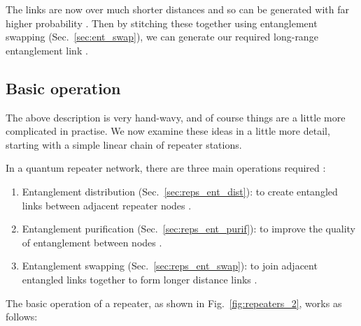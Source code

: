 \documentclass[twocolumn, aps, rmp, amsmath, amssymb, nofootinbib, superscriptaddress, longbibliography, floatfix, table-of-contents, eqsecnum]{revtex4-1}
\begin{document}
The links are now over much shorter distances and so can be generated with far higher probability \cite{}. Then by stitching these together using entanglement swapping (Sec.~\ref{sec:ent_swap}), we can generate our required long-range entanglement link \cite{}.

\subsection{Basic operation}

The above description is very hand-wavy, and of course things are a little more complicated in practise. We now examine these ideas in a little more detail, starting with a simple linear chain of repeater stations. 

In a quantum repeater network, there are three main operations required \cite{}:
\begin{enumerate}
\item Entanglement distribution (Sec.~\ref{sec:reps_ent_dist}): to create entangled links between adjacent repeater nodes \cite{}.
\item Entanglement purification (Sec.~\ref{sec:reps_ent_purif}): to improve the quality of entanglement between nodes \cite{}.
\item Entanglement swapping (Sec.~\ref{sec:reps_ent_swap}): to join adjacent entangled links together to form longer distance links \cite{}.
\end{enumerate}
The basic operation of a repeater, as shown in Fig.~\ref{fig:repeaters_2}, works as follows:
\end{document}
